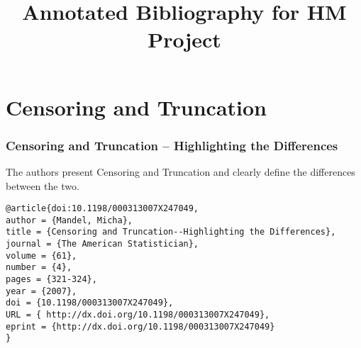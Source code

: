 \documentclass[11pt]{article}
\title{Annotated Bibliography for HM Project}
\begin{document}
\maketitle

\section*{Censoring and Truncation}
\subsubsection*{Censoring and Truncation -- Highlighting the Differences}
The authors present Censoring and Truncation and clearly define the differences between the two.
\begin{verbatim}
@article{doi:10.1198/000313007X247049,
author = {Mandel, Micha},
title = {Censoring and Truncation--Highlighting the Differences},
journal = {The American Statistician},
volume = {61},
number = {4},
pages = {321-324},
year = {2007},
doi = {10.1198/000313007X247049},
URL = { http://dx.doi.org/10.1198/000313007X247049},
eprint = {http://dx.doi.org/10.1198/000313007X247049}
}
\end{verbatim}
\end{document}

